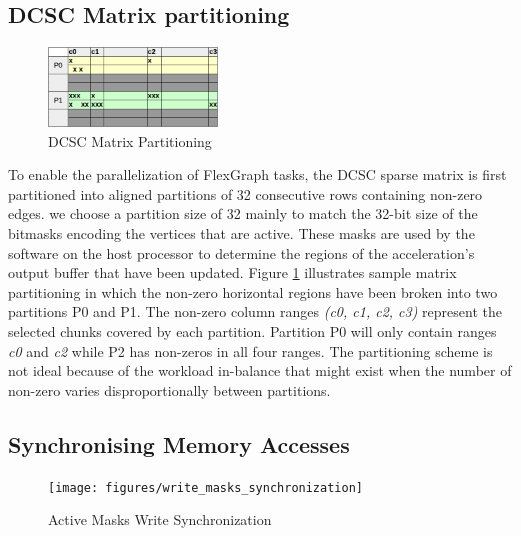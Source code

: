 \subsection{DCSC Matrix partitioning}

\begin{figure}[htbp]
\centering
\includegraphics[width=0.4\textwidth]{figures/matrix_partitioning}
\caption{DCSC Matrix Partitioning}
\label{fig:matrix_partitioning}
\end{figure}

To enable the parallelization of FlexGraph tasks, the DCSC sparse matrix is first partitioned into aligned partitions of 32 consecutive rows containing non-zero edges. we choose a partition size of 32 mainly to match the 32-bit size of the bitmasks encoding the vertices that are active. These masks are used by the software on the host processor to determine the regions of the acceleration's output buffer that have been updated. Figure \ref{fig:matrix_partitioning} illustrates sample matrix partitioning in which the non-zero horizontal regions have been broken into two partitions P0 and P1. The non-zero column ranges \textit{(c0, c1, c2, c3)} represent the selected chunks covered by each partition. Partition P0 will only contain ranges \textit{c0} and \textit{c2} while P2 has non-zeros in all four ranges. The partitioning scheme is not ideal because of the workload in-balance that might exist when the number of non-zero varies disproportionally between partitions.  

\subsection{Synchronising Memory Accesses}

\begin{figure}[htbp]
\centering
\texttt{[image: figures/write\_masks\_synchronization]}
\caption{Active Masks Write Synchronization}
\label{fig:write_masks_synchronization}
\end{figure}

